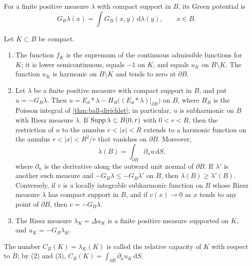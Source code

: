 For a finite positive measure $\lambda$ with compact support in $B$, its Green potential is
\[
 G_B\lambda(x)=\int G_B(x,y)\,\mathrm d\lambda(y),\qquad x\in B.
\]

\begin{proposition}\label{prop:compact-extremal}
Let $K\subset B$ be compact.
\begin{enumerate}
\item The function $f_K$ is the supremum of the continuous admissible functions for $K$; it is lower semicontinuous, equals $-1$ on $K$, and equals $u_K$ on $B\setminus K$. The function $u_K$ is harmonic on $B\setminus K$ and tends to zero at $\partial B$.
\item Let $\lambda$ be a finite positive measure with compact support in $B$, and put $u=-G_B\lambda$. Then $u=E_d*\lambda-H_B\bigl((E_d*\lambda)|_{\partial B}\bigr)$ on $B$, where $H_B$ is the Poisson integral of \cref{thm:ball-dirichlet}; in particular, $u$ is subharmonic on $B$ with Riesz measure $\lambda$. If $\operatorname{Supp}\lambda\subset B(0,r)$ with $0<r<R$, then the restriction of $u$ to the annulus $r<|x|<R$ extends to a harmonic function on the annulus $r<|x|<R^2/r$ that vanishes on $\partial B$. Moreover,
\[
 \lambda(B)=\int_{\partial B}\partial_nu\,\mathrm d S,
\]
where $\partial_n$ is the derivative along the outward unit normal of $\partial B$. If $\lambda'$ is another such measure and $-G_B\lambda\leq-G_B\lambda'$ on $B$, then $\lambda(B)\geq\lambda'(B)$. Conversely, if $v$ is a locally integrable subharmonic function on $B$ whose Riesz measure $\lambda$ has compact support in $B$, and if $v(x)\to0$ as $x$ tends to any point of $\partial B$, then $v=-G_B\lambda$.
\item The Riesz measure $\lambda_K=\Delta u_K$ is a finite positive measure supported on $K$, and $u_K=-G_B\lambda_K$.
\end{enumerate}
The number $C_B(K)=\lambda_K(K)$ is called the relative capacity of $K$ with respect to $B$; by \textup{(2)} and \textup{(3)}, $C_B(K)=\int_{\partial B}\partial_nu_K\,\mathrm dS$.
\end{proposition}
